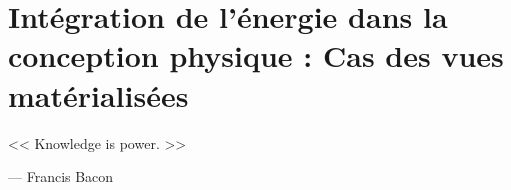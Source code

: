 \chapter{Intégration de l'énergie dans la conception physique : Cas des vues matérialisées}
\label{chap6}

\epigraph{<< Knowledge is power. >>}{--- \textup{Francis Bacon}}

\NoChapterPrefix \NoChapterNumberInRef {\hypersetup{linkcolor=black} \minitoc}

\makeatletter
\renewcommand{\thefigure}{\ifnum \c@section>\z@ \thechapter.\fi
 \@arabic\c@figure}
\makeatother

\makeatletter
\renewcommand{\thetable}{\ifnum \c@section>\z@ \thechapter.\fi
 \@arabic\c@table}
\makeatother

\makeatletter
\renewcommand{\theequation}{\ifnum \c@section>\z@ \thechapter.\fi
 \@arabic\c@equation}
\makeatother


\newpage

